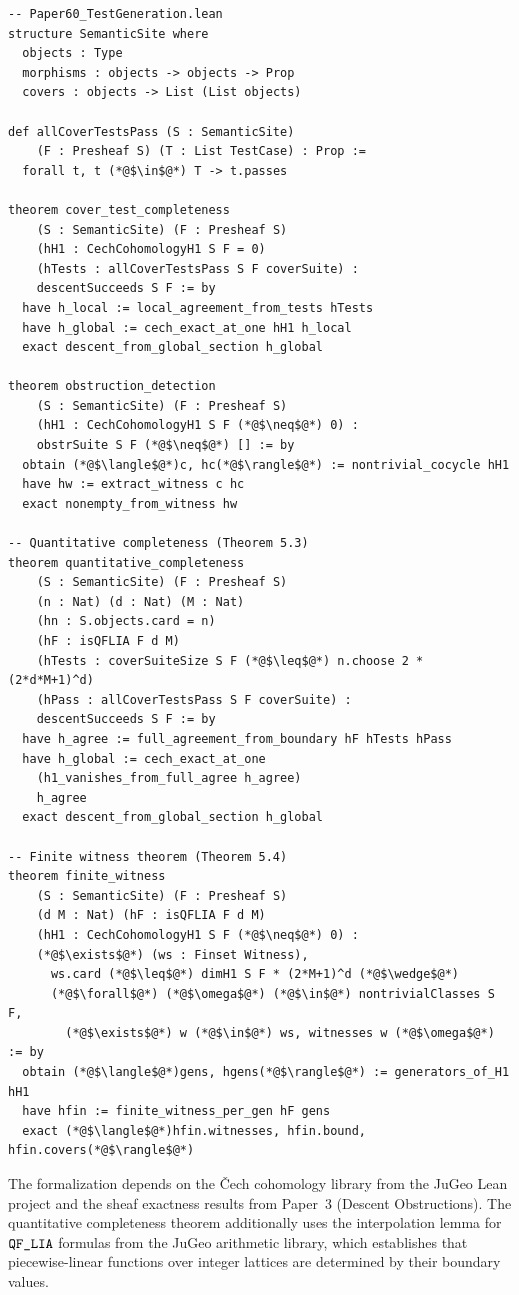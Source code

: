 \documentclass[11pt]{article}
\begin{document}
\begin{lstlisting}[style=jugeo-python,title=Lean 4 Formalization Sketch]
-- Paper60_TestGeneration.lean
structure SemanticSite where
  objects : Type
  morphisms : objects -> objects -> Prop
  covers : objects -> List (List objects)

def allCoverTestsPass (S : SemanticSite)
    (F : Presheaf S) (T : List TestCase) : Prop :=
  forall t, t (*@$\in$@*) T -> t.passes

theorem cover_test_completeness
    (S : SemanticSite) (F : Presheaf S)
    (hH1 : CechCohomologyH1 S F = 0)
    (hTests : allCoverTestsPass S F coverSuite) :
    descentSucceeds S F := by
  have h_local := local_agreement_from_tests hTests
  have h_global := cech_exact_at_one hH1 h_local
  exact descent_from_global_section h_global

theorem obstruction_detection
    (S : SemanticSite) (F : Presheaf S)
    (hH1 : CechCohomologyH1 S F (*@$\neq$@*) 0) :
    obstrSuite S F (*@$\neq$@*) [] := by
  obtain (*@$\langle$@*)c, hc(*@$\rangle$@*) := nontrivial_cocycle hH1
  have hw := extract_witness c hc
  exact nonempty_from_witness hw

-- Quantitative completeness (Theorem 5.3)
theorem quantitative_completeness
    (S : SemanticSite) (F : Presheaf S)
    (n : Nat) (d : Nat) (M : Nat)
    (hn : S.objects.card = n)
    (hF : isQFLIA F d M)
    (hTests : coverSuiteSize S F (*@$\leq$@*) n.choose 2 * (2*d*M+1)^d)
    (hPass : allCoverTestsPass S F coverSuite) :
    descentSucceeds S F := by
  have h_agree := full_agreement_from_boundary hF hTests hPass
  have h_global := cech_exact_at_one
    (h1_vanishes_from_full_agree h_agree)
    h_agree
  exact descent_from_global_section h_global

-- Finite witness theorem (Theorem 5.4)
theorem finite_witness
    (S : SemanticSite) (F : Presheaf S)
    (d M : Nat) (hF : isQFLIA F d M)
    (hH1 : CechCohomologyH1 S F (*@$\neq$@*) 0) :
    (*@$\exists$@*) (ws : Finset Witness),
      ws.card (*@$\leq$@*) dimH1 S F * (2*M+1)^d (*@$\wedge$@*)
      (*@$\forall$@*) (*@$\omega$@*) (*@$\in$@*) nontrivialClasses S F,
        (*@$\exists$@*) w (*@$\in$@*) ws, witnesses w (*@$\omega$@*) := by
  obtain (*@$\langle$@*)gens, hgens(*@$\rangle$@*) := generators_of_H1 hH1
  have hfin := finite_witness_per_gen hF gens
  exact (*@$\langle$@*)hfin.witnesses, hfin.bound, hfin.covers(*@$\rangle$@*)
\end{lstlisting}

The formalization depends on the \v{C}ech cohomology library from the JuGeo
Lean project and the sheaf exactness results from Paper~3 (Descent
Obstructions).  The quantitative completeness theorem additionally uses
the interpolation lemma for $\texttt{QF\_LIA}$ formulas from the JuGeo arithmetic
library, which establishes that piecewise-linear functions over integer
lattices are determined by their boundary values.
\end{document}
